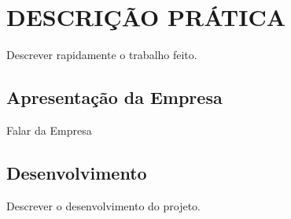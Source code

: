 \chapter{DESCRIÇÃO PRÁTICA}
	\thispagestyle{empty}

	Descrever rapidamente o trabalho feito. 

	\section{Apresentação da Empresa}
	
		Falar da Empresa
		
\section{Desenvolvimento}
	Descrever o desenvolvimento do projeto.
		
	
